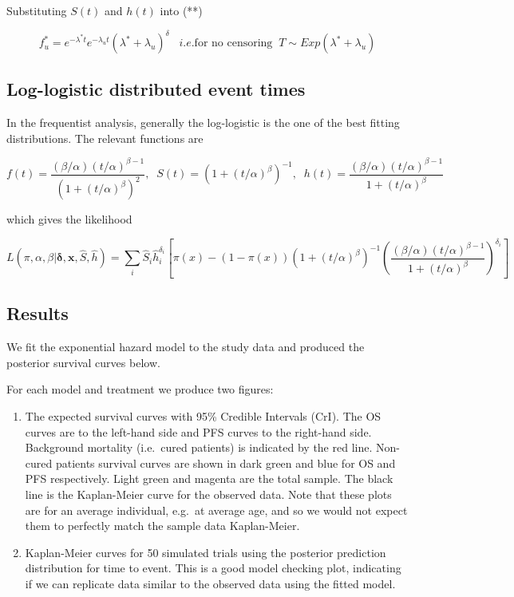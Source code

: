 \documentclass[
]{article}
\begin{document}
Substituting \(S(t)\) and \(h(t)\) into (**)

\[
f^*_u = e^{-\lambda^* t} e^{-\lambda_u t} (\lambda^* + \lambda_u)^{\delta} \;\;\; i.e. \mbox{for no censoring} \;\; T \sim Exp(\lambda^* + \lambda_u)
\]

\hypertarget{log-logistic-distributed-event-times}{%
\subsection{Log-logistic distributed event
times}\label{log-logistic-distributed-event-times}}

In the frequentist analysis, generally the log-logistic is the one of
the best fitting distributions. The relevant functions are

\[
f(t) = \frac{(\beta/\alpha)(t/\alpha)^{\beta - 1}}{(1 + (t/\alpha)^{\beta})^2}, \;\; S(t) = (1 + (t/\alpha)^{\beta})^{-1}, \;\; h(t) = \frac{(\beta/\alpha)(t/\alpha)^{\beta - 1}}{1 + (t/\alpha)^{\beta}}
\]

which gives the likelihood

\[
L(\pi, \alpha, \beta | \boldsymbol{\delta}, \boldsymbol{x}, \hat{S}, \hat{h}) =
\sum_i \hat{S}_i \hat{h}_i^{\delta_i} \left[ \pi(x) - (1 - \pi(x))(1 + (t/\alpha)^{\beta})^{-1} \left(\frac{(\beta/\alpha)(t/\alpha)^{\beta - 1}}{1 + (t/\alpha)^{\beta}} \right)^{\delta_i} \right]
\]

\hypertarget{results}{%
\subsection{Results}\label{results}}

We fit the exponential hazard model to the study data and produced the
posterior survival curves below.

For each model and treatment we produce two figures:

\begin{enumerate}
\def\labelenumi{\arabic{enumi}.}
\item
  The expected survival curves with 95\% Credible Intervals (CrI). The
  OS curves are to the left-hand side and PFS curves to the right-hand
  side. Background mortality (i.e.~cured patients) is indicated by the
  red line. Non-cured patients survival curves are shown in dark green
  and blue for OS and PFS respectively. Light green and magenta are the
  total sample. The black line is the Kaplan-Meier curve for the
  observed data. Note that these plots are for an average individual,
  e.g.~at average age, and so we would not expect them to perfectly
  match the sample data Kaplan-Meier.
\item
  Kaplan-Meier curves for 50 simulated trials using the posterior
  prediction distribution for time to event. This is a good model
  checking plot, indicating if we can replicate data similar to the
  observed data using the fitted model.
\end{enumerate}
\end{document}
